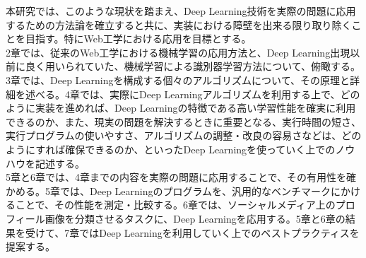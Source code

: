 本研究では、このような現状を踏まえ、Deep Learning技術を実際の問題に応用するための方法論を確立すると共に、実装における障壁を出来る限り取り除くことを目指す。特にWeb工学における応用を目標とする。\\
2章では、従来のWeb工学における機械学習の応用方法と、Deep Learning出現以前に良く用いられていた、機械学習による識別器学習方法について、俯瞰する。3章では、Deep Learningを構成する個々のアルゴリズムについて、その原理と詳細を述べる。4章では、実際にDeep Learningアルゴリズムを利用する上で、どのように実装を進めれば、Deep Learningの特徴である高い学習性能を確実に利用できるのか、また、現実の問題を解決するときに重要となる、実行時間の短さ、実行プログラムの使いやすさ、アルゴリズムの調整・改良の容易さなどは、どのようにすれば確保できるのか、といったDeep Learningを使っていく上でのノウハウを記述する。\\
5章と6章では、4章までの内容を実際の問題に応用することで、その有用性を確かめる。5章では、Deep Learningのプログラムを、汎用的なベンチマークにかけることで、その性能を測定・比較する。6章では、ソーシャルメディア上のプロフィール画像を分類させるタスクに、Deep Learningを応用する。5章と6章の結果を受けて、7章ではDeep Learningを利用していく上でのベストプラクティスを提案する。

